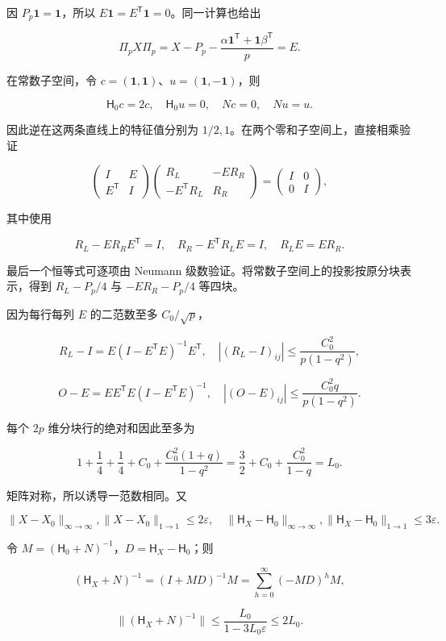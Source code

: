 \documentclass[11pt,a4paper]{article}
\begin{document}
因 \(P_p\mathbf1=\mathbf1\)，所以 \(E\mathbf1=E^{\mathsf T}\mathbf1=0\)。同一计算也给出

\[
\Pi_pX\Pi_p=X-P_p-\frac{\alpha\mathbf1^{\mathsf T}+\mathbf1\beta^{\mathsf T}}p=E.
\]

在常数子空间，令 \(c=(\mathbf1,\mathbf1)\)、\(u=(\mathbf1,-\mathbf1)\)，则

\[
\mathsf H_0c=2c,\quad\mathsf H_0u=0,\quad Nc=0,\quad Nu=u.
\]

因此逆在这两条直线上的特征值分别为 \(1/2,1\)。在两个零和子空间上，直接相乘验证

\[
\begin{pmatrix}I&E\\E^{\mathsf T}&I\end{pmatrix}
\begin{pmatrix}R_L&-ER_R\\-E^{\mathsf T}R_L&R_R\end{pmatrix}
=\begin{pmatrix}I&0\\0&I\end{pmatrix},
\]

其中使用

\[
R_L-ER_RE^{\mathsf T}=I,\quad R_R-E^{\mathsf T}R_LE=I,
\quad R_LE=ER_R.
\]

最后一个恒等式可逐项由 Neumann 级数验证。将常数子空间上的投影按原分块表示，得到 \(R_L-P_p/4\) 与 \(-ER_R-P_p/4\) 等四块。

因为每行每列 \(E\) 的二范数至多 \(C_0/\sqrt p\)，

\[
R_L-I=E(I-E^{\mathsf T}E)^{-1}E^{\mathsf T},
\quad |(R_L-I)_{ij}|\le\frac{C_0^2}{p(1-q^2)},
\]

\[
O-E=EE^{\mathsf T}E(I-E^{\mathsf T}E)^{-1},
\quad |(O-E)_{ij}|\le\frac{C_0^2q}{p(1-q^2)}.
\]

每个 \(2p\) 维分块行的绝对和因此至多为

\[
1+\frac14+\frac14+C_0+
\frac{C_0^2(1+q)}{1-q^2}
=\frac32+C_0+\frac{C_0^2}{1-q}=L_0.
\]

矩阵对称，所以诱导一范数相同。又

\[
\|X-X_0\|_{\infty\to\infty},\|X-X_0\|_{1\to1}\le2\varepsilon,
\quad\|\mathsf H_X-\mathsf H_0\|_{\infty\to\infty},
\|\mathsf H_X-\mathsf H_0\|_{1\to1}\le3\varepsilon.
\]

令 \(M=(\mathsf H_0+N)^{-1}\)，\(D=\mathsf H_X-\mathsf H_0\)；则

\[
(\mathsf H_X+N)^{-1}=(I+MD)^{-1}M
=\sum_{h=0}^{\infty}(-MD)^hM,
\]

\[
\|(\mathsf H_X+N)^{-1}\|\le\frac{L_0}{1-3L_0\varepsilon}\le2L_0.
\]
\end{document}
